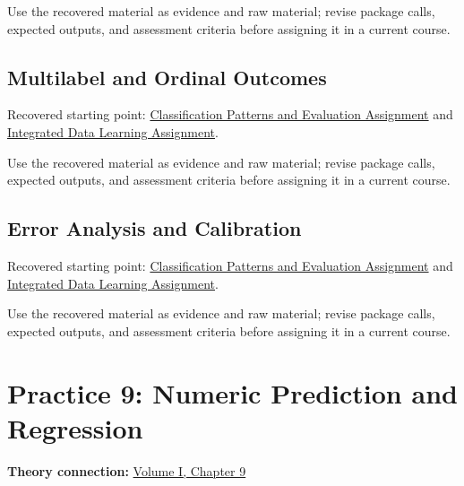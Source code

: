 \documentclass[
  letterpaper,
]{scrbook}
\begin{document}
Use the recovered material as evidence and raw material; revise package
calls, expected outputs, and assessment criteria before assigning it in
a current course.

\section*{Multilabel and Ordinal
Outcomes}\label{sec-pr-08-multilabel-and-ordinal-outcomes}


Recovered starting point:
\hyperref[sec-lab-classification-patterns-assignment]{Classification
Patterns and Evaluation Assignment} and
\hyperref[sec-lab-integrated-learning-assignment]{Integrated Data
Learning Assignment}.

Use the recovered material as evidence and raw material; revise package
calls, expected outputs, and assessment criteria before assigning it in
a current course.

\section*{Error Analysis and
Calibration}\label{sec-pr-08-error-analysis-and-calibration}


Recovered starting point:
\hyperref[sec-lab-classification-patterns-assignment]{Classification
Patterns and Evaluation Assignment} and
\hyperref[sec-lab-integrated-learning-assignment]{Integrated Data
Learning Assignment}.

Use the recovered material as evidence and raw material; revise package
calls, expected outputs, and assessment criteria before assigning it in
a current course.

\chapter*{Practice 9: Numeric Prediction and
Regression}\label{ch-practice-09}


\textbf{Theory connection:} \hyperref[ch-regression]{Volume I, Chapter
9}
\end{document}
